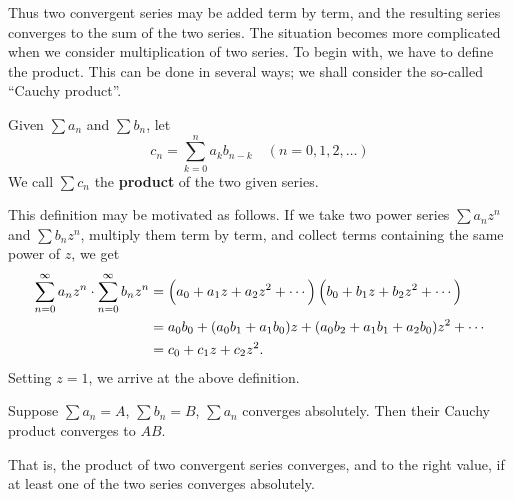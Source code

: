 Thus two convergent series may be added term by term, and the resulting series converges to the sum of the two series. The situation becomes more complicated when we consider multiplication of two series. To begin with, we have to define the product. This can be done in several ways; we shall consider the so-called ``Cauchy product''. 

\begin{definition}
Given $\sum a_n$ and $\sum b_n$, let
\[c_n=\sum_{k=0}^{n}a_k b_{n-k}\quad(n=0,1,2,\dots)\]
We call $\sum c_n$ the \textbf{product} of the two given series.
\end{definition}

This definition may be motivated as follows. If we take two power series $\sum a_nz^n$ and $\sum b_nz^n$, multiply them term by term, and collect terms containing the same power of $z$, we get
\begin{align*}
\sum_{n=0}^{\infty}a_nz^n\cdot\sum_{n=0}^{\infty}b_nz^n
&=\left(a_0+a_1z+a_2z^2+\cdots\right)\left(b_0+b_1z+b_2z^2+\cdots\right)\\
&=a_0b_0+(a_0b_1+a_1b_0)z+(a_0b_2+a_1b_1+a_2b_0)z^2+\cdots\\
&=c_0+c_1z+c_2z^2.
\end{align*}
Setting $z=1$, we arrive at the above definition. 

\begin{theorem}[Mertens]
Suppose $\sum a_n=A$, $\sum b_n=B$, $\sum a_n$ converges absolutely. Then their Cauchy product converges to $AB$.
\end{theorem}

That is, the product of two convergent series converges, and to the right value, if at least one of the two series converges absolutely.

